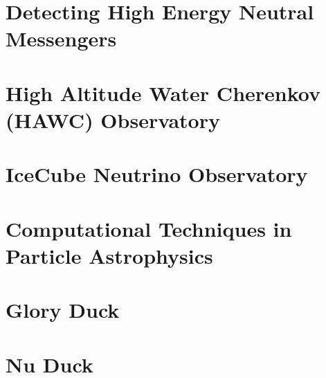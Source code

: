 \documentclass[PhD]{msu-thesis}
\begin{document}
\chapter{Detecting High Energy Neutral Messengers\label{sec:multmessenger}}


\chapter{High Altitude Water Cherenkov (HAWC) Observatory\label{sec:hawc}}


\chapter{IceCube Neutrino Observatory\label{sec:ice3}}


\chapter{Computational Techniques in Particle Astrophysics}


\chapter{Glory Duck\label{sec:glory_duck}}

\chapter{Nu Duck\label{sec:nu_duck}}

\backmatter
\SingleSpacing
% 
% 
\printbibliography
\end{document}
